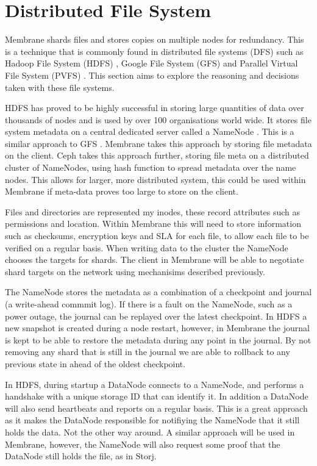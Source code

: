 \documentclass[a4paper, 11pt, twocolumn, twoside]{report}
\begin{document}
\section{Distributed File System}

Membrane shards files and stores copies on multiple nodes for redundancy. This is a technique that is commonly found in distributed file systems (DFS) such as Hadoop File System (HDFS) \citep{hdfsAnalysis}, Google File System (GFS) \citep{TheGFS} and Parallel Virtual File System (PVFS) \citep{ross2000pvfs}. This section aims to explore the reasoning and decisions taken with these file systems.

HDFS has proved to be highly successful in storing large quantities of data over thousands of nodes and is used by over 100 organisations world wide. It stores file system metadata on a central dedicated server called a NameNode \citep{hdfsAnalysis}. This is a similar approach to GFS \citep{mckusick2010gfs}. Membrane takes this approach by storing file metadata on the client. Ceph takes this approach further, storing file meta on a distributed cluster of NameNodes, using hash function to spread metadata over the name nodes. \citep{weil2006ceph} This allows for larger, more distributed system, this could be used within Membrane if meta-data proves too large to store on the client.

Files and directories are represented my inodes, these record attributes such as permissions and location. Within Membrane this will need to store information such as checksums, encryption keys and SLA for each file, to allow each file to be verified on a regular basis. When writing data to the cluster the NameNode chooses the targets for shards. The client in Membrane will be able to negotiate shard targets on the network using mechanisims described previously.

The NameNode stores the metadata as a combination of a checkpoint and journal (a write-ahead commmit log). If there is a fault on the NameNode, such as a power outage, the journal can be replayed over the latest checkpoint. In HDFS a new snapshot is created during a node restart, however, in Membrane the journal is kept to be able to restore the metadata during any point in the journal. By not removing any shard that is still in the journal we are able to rollback to any previous state in ahead of the oldest checkpoint.

In HDFS, during startup a DataNode connects to a NameNode, and performs a handshake with a unique storage ID that can identify it. In addition a DataNode will also send heartbeats and reports on a regular basis. \cite{hdfsAnalysis} This is a great approach as it makes the DataNode responsible for notifiying the NameNode that it still holds the data. Not the other way around. A similar approach will be used in Membrane, however, the NameNode will also request some proof that the DataNode still holds the file, as in Storj.
\end{document}
